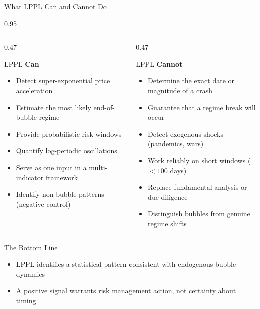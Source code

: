 \documentclass[9pt, aspectratio=169, t]{beamer}
\begin{document}
\begin{frame}{What LPPL Can and Cannot Do}
    \begin{cminipage}{0.95\textwidth}
    {\footnotesize
    \begin{columns}[T]
        \begin{column}{0.47\textwidth}
            \begin{exampleblock}{LPPL \textbf{Can}}
                \begin{itemize}\setlength{\itemsep}{0pt}
                    \item Detect super-exponential price acceleration
                    \item Estimate the most likely end-of-bubble regime
                    \item Provide probabilistic risk windows
                    \item Quantify log-periodic oscillations
                    \item Serve as one input in a multi-indicator framework
                    \item Identify non-bubble patterns (negative control)
                \end{itemize}
            \end{exampleblock}
        \end{column}
        \begin{column}{0.47\textwidth}
            \begin{alertblock}{LPPL \textbf{Cannot}}
                \begin{itemize}\setlength{\itemsep}{0pt}
                    \item Determine the exact date or magnitude of a crash
                    \item Guarantee that a regime break will occur
                    \item Detect exogenous shocks (pandemics, wars)
                    \item Work reliably on short windows ($< 100$ days)
                    \item Replace fundamental analysis or due diligence
                    \item Distinguish bubbles from genuine regime shifts
                \end{itemize}
            \end{alertblock}
        \end{column}
    \end{columns}
    \vspace{-1mm}
    \begin{block}{The Bottom Line}
        \begin{itemize}\setlength{\itemsep}{0pt}
            \item LPPL identifies a statistical pattern consistent with endogenous bubble dynamics
            \item A positive signal warrants risk management action, not certainty about timing
        \end{itemize}
    \end{block}
    }
    \end{cminipage}
\end{frame}
\end{document}

